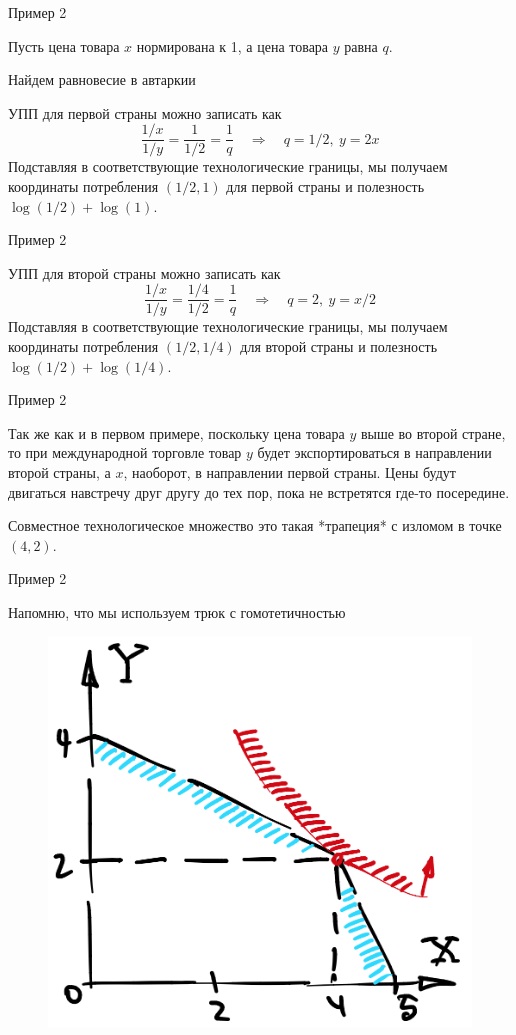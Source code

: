 \documentclass{beamer}
\begin{document}
\begin{frame}{Пример 2}

Пусть цена товара $x$ нормирована к 1, а цена товара $y$ равна $q$.

Найдем равновесие в автаркии

УПП для первой страны можно записать как
$$ \frac{1/x}{1/y} = \frac{1}{1/2} = \frac{1}{q} \quad \Rightarrow \quad q = 1/2, \ y = 2x$$
Подставляя в соответствующие технологические границы, мы получаем координаты потребления $(1/2,1)$ для первой страны и полезность $\log(1/2) + \log(1)$.

\end{frame}

\begin{frame}{Пример 2}

УПП для второй страны можно записать как
$$ \frac{1/x}{1/y} = \frac{1/4}{1/2} = \frac{1}{q} \quad \Rightarrow \quad q = 2, \ y = x/2$$
Подставляя в соответствующие технологические границы, мы получаем координаты потребления $(1/2,1/4)$ для второй страны и полезность $\log(1/2) + \log(1/4)$.

\end{frame}

\begin{frame}{Пример 2}

Так же как и в первом примере, поскольку цена товара $y$ выше во второй стране, то при международной торговле товар $y$ будет экспортироваться в направлении второй страны, а $x$, наоборот, в направлении первой страны. Цены будут двигаться навстречу друг другу до тех пор, пока не встретятся где-то посередине.

Совместное технологическое множество это такая *трапеция* с изломом в точке $(4,2)$.

\end{frame}

\begin{frame}{Пример 2}

Напомню, что мы используем трюк с гомотетичностью
\begin{figure}[hbt]
\centering
\includegraphics[width=.6 \textwidth]{pic3.png}
\end{figure}
\end{frame}
\end{document}
